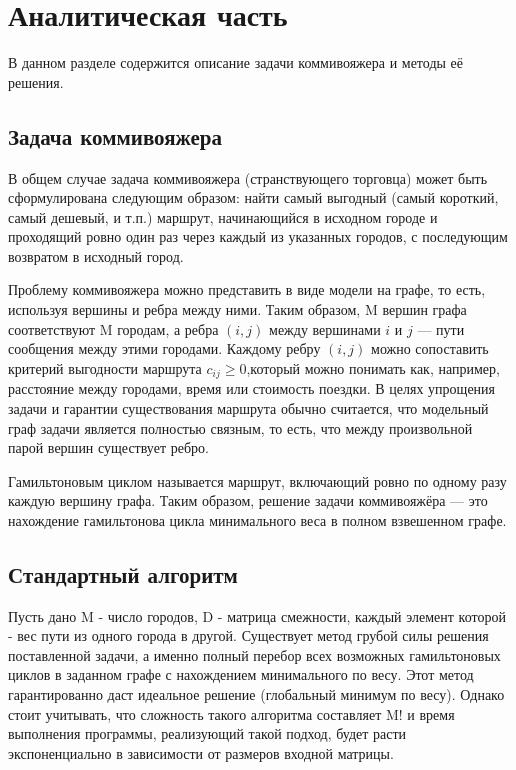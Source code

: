 \documentclass[a4paper,12pt]{report}
\begin{document}
\chapter{Аналитическая часть}
\hspace{0.6cm}В данном разделе содержится описание задачи коммивояжера и  методы её решения.
\section{Задача коммивояжера}
\hspace{0.6cm}В общем случае задача коммивояжера (странствующего торговца) может быть сформулирована следующим образом: найти самый выгодный (самый короткий, самый дешевый, и т.п.) маршрут, начинающийся в исходном городе и проходящий ровно один раз через каждый из указанных городов, с последующим возвратом в исходный город.

Проблему коммивояжера можно представить в виде модели на графе, то есть, используя вершины и ребра между ними. Таким образом, M вершин графа соответствуют M городам, а ребра $(i, j)$ между вершинами $i$ и $j$ — пути сообщения между этими городами. Каждому ребру $(i, j)$ можно сопоставить критерий выгодности маршрута $c_{ij} \geq 0$,который можно понимать как, например, расстояние между городами, время или стоимость поездки.  В целях упрощения задачи и гарантии существования маршрута обычно считается, что модельный граф задачи является полностью связным, то есть, что между произвольной парой вершин существует ребро.

Гамильтоновым циклом называется маршрут, включающий ровно по одному разу каждую вершину графа. Таким образом, решение задачи коммивояжёра — это нахождение гамильтонова цикла минимального веса в полном взвешенном графе.

\section{Стандартный алгоритм}

\hspace{0.6cm}Пусть  дано M - число городов, D - матрица смежности, каждый элемент которой - вес пути из одного города в другой. Существует метод грубой силы решения поставленной задачи, а именно полный перебор всех возможных гамильтоновых циклов в заданном графе с нахождением минимального по весу. Этот метод гарантированно даст идеальное решение (глобальный минимум по весу). Однако стоит учитывать, что сложность такого алгоритма составляет M! и время выполнения программы, реализующий такой подход, будет расти экспоненциально в зависимости от размеров входной матрицы.
\end{document}

